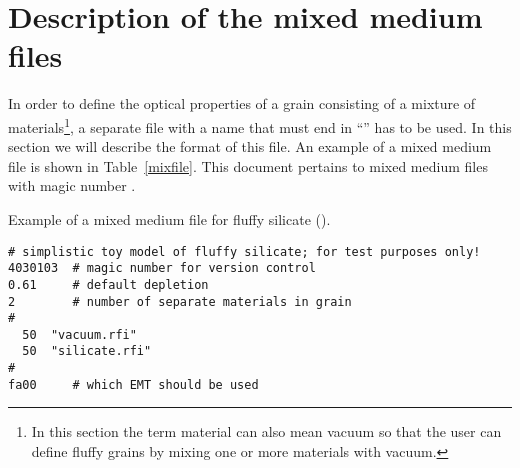 \section{Description of the mixed medium files}
\label{mix:descr}

In order to define the optical properties of a grain consisting of a mixture
of materials\footnote{In this section the term material can also mean vacuum
  so that the user can define fluffy grains by mixing one or more materials
  with vacuum.}, a separate file with a name that must end in
``'' has to be used. In this section we will describe the format
of this file. An example of a mixed medium file is shown in
Table~\ref{mixfile}. This document pertains to mixed medium files with magic
number .

\begin{table}
\caption[Example of a mixed medium file for fluffy silicate.]
{Example of a mixed medium file for fluffy silicate ().}
\label{mixfile}
\begin{verbatim}
# simplistic toy model of fluffy silicate; for test purposes only!
4030103  # magic number for version control
0.61     # default depletion
2        # number of separate materials in grain
#
  50  "vacuum.rfi"
  50  "silicate.rfi"
#
fa00     # which EMT should be used
\end{verbatim}
\end{table}

